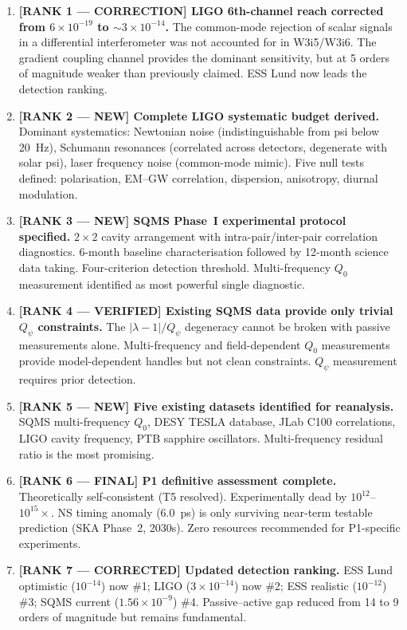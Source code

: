 \documentclass[11pt]{article}
\newcommand{\lam}{\lambda}
\newcommand{\ee}[1]{\times 10^{#1}}
\newcommand{\Qpsi}{Q_\psi}
\newcommand{\lbone}{|\lam - 1|}
\theoremstyle{definition}
\theoremstyle{remark}
\begin{document}
\begin{enumerate}[label=\textbf{W3i7-F\arabic*.}, itemsep=6pt]

\item \textbf{[RANK 1 --- CORRECTION] LIGO 6th-channel reach corrected
  from $6\ee{-19}$ to $\sim 3\ee{-14}$.}
  The common-mode rejection of scalar signals in a differential
  interferometer was not accounted for in W3i5/W3i6. The gradient
  coupling channel provides the dominant sensitivity, but at 5 orders
  of magnitude weaker than previously claimed. ESS Lund now leads
  the detection ranking.

\item \textbf{[RANK 2 --- NEW] Complete LIGO systematic budget derived.}
  Dominant systematics: Newtonian noise (indistinguishable from psi
  below 20~Hz), Schumann resonances (correlated across detectors,
  degenerate with solar psi), laser frequency noise (common-mode
  mimic). Five null tests defined: polarisation, EM--GW correlation,
  dispersion, anisotropy, diurnal modulation.

\item \textbf{[RANK 3 --- NEW] SQMS Phase~I experimental protocol
  specified.}
  $2\times 2$ cavity arrangement with intra-pair/inter-pair
  correlation diagnostics. 6-month baseline characterisation followed
  by 12-month science data taking. Four-criterion detection threshold.
  Multi-frequency $Q_0$ measurement identified as most powerful
  single diagnostic.

\item \textbf{[RANK 4 --- VERIFIED] Existing SQMS data provide
  only trivial $\Qpsi$ constraints.}
  The $\lbone/\Qpsi$ degeneracy cannot be broken with passive
  measurements alone. Multi-frequency and field-dependent $Q_0$
  measurements provide model-dependent handles but not clean
  constraints. $\Qpsi$ measurement requires prior detection.

\item \textbf{[RANK 5 --- NEW] Five existing datasets identified
  for reanalysis.}
  SQMS multi-frequency $Q_0$, DESY TESLA database, JLab C100
  correlations, LIGO cavity frequency, PTB sapphire oscillators.
  Multi-frequency residual ratio is the most promising.

\item \textbf{[RANK 6 --- FINAL] P1 definitive assessment complete.}
  Theoretically self-consistent (T5 resolved). Experimentally dead
  by $10^{12}$--$10^{15}\times$. NS timing anomaly (6.0~ps) is only
  surviving near-term testable prediction (SKA Phase~2, 2030s).
  Zero resources recommended for P1-specific experiments.

\item \textbf{[RANK 7 --- CORRECTED] Updated detection ranking.}
  ESS Lund optimistic ($10^{-14}$) now \#1; LIGO ($3\ee{-14}$) now
  \#2; ESS realistic ($10^{-12}$) \#3; SQMS current ($1.56\ee{-9}$) \#4.
  Passive--active gap reduced from 14 to 9 orders of magnitude but
  remains fundamental.
\end{enumerate}
\end{document}
